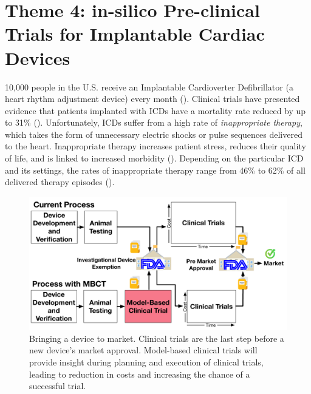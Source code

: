 \chapter{Theme 4: in-silico Pre-clinical Trials for Implantable Cardiac Devices} 
10,000 people in the U.S. receive an Implantable Cardioverter Defibrillator (a heart rhythm adjustment device) every month (\cite{asktheicd}).
Clinical trials have presented evidence that patients implanted with ICDs have a mortality rate reduced by up to 31\% (\cite{maditrit}).
Unfortunately, ICDs suffer from a high rate of \emph{inappropriate therapy}, which takes the form of unnecessary electric shocks or pulse sequences delivered to the heart.
Inappropriate therapy increases patient stress, reduces their quality of life, and is linked to increased morbidity (\cite{shock_mortality}).
Depending on the particular ICD and its settings, the rates of inappropriate therapy range from 46\% to 62\% of all delivered therapy episodes (\cite{GoldABBTB11_RIGHTresults}).
	\begin{figure}[t]
		\centering
		\includegraphics[scale=0.5]{figures/figTransResearchSpectrum.pdf}
		\caption{\small Bringing a device to market.
			Clinical trials are the last step before a new device's market approval.
			Model-based clinical trials will provide insight during planning and execution of clinical trials, leading to reduction in costs and increasing the chance of a successful trial.}
		\label{fig:spectrum}
	\end{figure}


